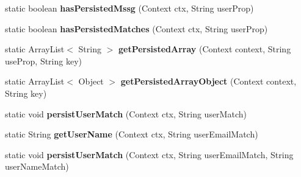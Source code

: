 \begin{DoxyCompactItemize}
\item 
static boolean {\bfseries has\+Persisted\+Mssg} (Context ctx, String user\+Prop)\hypertarget{classcom_1_1example_1_1sebastian_1_1tindertp_1_1commonTools_1_1ArraySerialization_ad7f9b05eb2a66602b9659b1f0ac88d2c}{}\label{classcom_1_1example_1_1sebastian_1_1tindertp_1_1commonTools_1_1ArraySerialization_ad7f9b05eb2a66602b9659b1f0ac88d2c}

\item 
static boolean {\bfseries has\+Persisted\+Matches} (Context ctx, String user\+Prop)\hypertarget{classcom_1_1example_1_1sebastian_1_1tindertp_1_1commonTools_1_1ArraySerialization_a8c4d221866015bbce178963c60d68c97}{}\label{classcom_1_1example_1_1sebastian_1_1tindertp_1_1commonTools_1_1ArraySerialization_a8c4d221866015bbce178963c60d68c97}

\item 
static Array\+List$<$ String $>$ {\bfseries get\+Persisted\+Array} (Context context, String use\+Prop, String key)\hypertarget{classcom_1_1example_1_1sebastian_1_1tindertp_1_1commonTools_1_1ArraySerialization_a556a87b0734ef238396e65d629ea2627}{}\label{classcom_1_1example_1_1sebastian_1_1tindertp_1_1commonTools_1_1ArraySerialization_a556a87b0734ef238396e65d629ea2627}

\item 
static Array\+List$<$ Object $>$ {\bfseries get\+Persisted\+Array\+Object} (Context context, String key)\hypertarget{classcom_1_1example_1_1sebastian_1_1tindertp_1_1commonTools_1_1ArraySerialization_a40211fca8df5f97480d275c5aa9ed812}{}\label{classcom_1_1example_1_1sebastian_1_1tindertp_1_1commonTools_1_1ArraySerialization_a40211fca8df5f97480d275c5aa9ed812}

\item 
static void {\bfseries persist\+User\+Match} (Context ctx, String user\+Match)\hypertarget{classcom_1_1example_1_1sebastian_1_1tindertp_1_1commonTools_1_1ArraySerialization_a59bd32db77f877b42d4d0fe14dc4c5c0}{}\label{classcom_1_1example_1_1sebastian_1_1tindertp_1_1commonTools_1_1ArraySerialization_a59bd32db77f877b42d4d0fe14dc4c5c0}

\item 
static String {\bfseries get\+User\+Name} (Context ctx, String user\+Email\+Match)\hypertarget{classcom_1_1example_1_1sebastian_1_1tindertp_1_1commonTools_1_1ArraySerialization_aa7ae212523ee85ff8e3c1ab9ab2baf84}{}\label{classcom_1_1example_1_1sebastian_1_1tindertp_1_1commonTools_1_1ArraySerialization_aa7ae212523ee85ff8e3c1ab9ab2baf84}

\item 
static void {\bfseries persist\+User\+Match} (Context ctx, String user\+Email\+Match, String user\+Name\+Match)\hypertarget{classcom_1_1example_1_1sebastian_1_1tindertp_1_1commonTools_1_1ArraySerialization_a74148a23761f8cd487aa6d48370e030d}{}\label{classcom_1_1example_1_1sebastian_1_1tindertp_1_1commonTools_1_1ArraySerialization_a74148a23761f8cd487aa6d48370e030d}


\end{DoxyCompactItemize}
